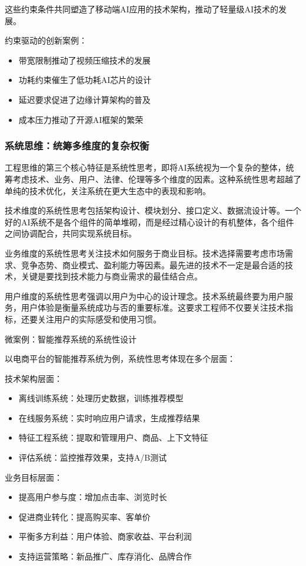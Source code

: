 这些约束条件共同塑造了移动端AI应用的技术架构，推动了轻量级AI技术的发展。

约束驱动的创新案例：

\begin{itemize}
\item 带宽限制推动了视频压缩技术的发展
\item 功耗约束催生了低功耗AI芯片的设计
\item 延迟要求促进了边缘计算架构的普及
\item 成本压力推动了开源AI框架的繁荣
\end{itemize}

\subsubsection{系统思维：统筹多维度的复杂权衡}

工程思维的第三个核心特征是系统性思考，即将AI系统视为一个复杂的整体，统筹考虑技术、业务、用户、法律、伦理等多个维度的因素。这种系统性思考超越了单纯的技术优化，关注系统在更大生态中的表现和影响。

技术维度的系统性思考包括架构设计、模块划分、接口定义、数据流设计等。一个好的AI系统不是各个组件的简单堆砌，而是经过精心设计的有机整体，各个组件之间协调配合，共同实现系统目标。

业务维度的系统性思考关注技术如何服务于商业目标。技术选择需要考虑市场需求、竞争态势、商业模式、盈利能力等因素。最先进的技术不一定是最合适的技术，关键是要找到技术能力与商业需求的最佳结合点。

用户维度的系统性思考强调以用户为中心的设计理念。技术系统最终要为用户服务，用户体验是衡量系统成功与否的重要标准。这要求工程师不仅要关注技术指标，还要关注用户的实际感受和使用习惯。

微案例：智能推荐系统的系统性设计

以电商平台的智能推荐系统为例，系统性思考体现在多个层面：

技术架构层面：
\begin{itemize}
\item 离线训练系统：处理历史数据，训练推荐模型
\item 在线服务系统：实时响应用户请求，生成推荐结果
\item 特征工程系统：提取和管理用户、商品、上下文特征
\item 评估系统：监控推荐效果，支持A/B测试
\end{itemize}

业务目标层面：
\begin{itemize}
\item 提高用户参与度：增加点击率、浏览时长
\item 促进商业转化：提高购买率、客单价
\item 平衡多方利益：用户体验、商家收益、平台利润
\item 支持运营策略：新品推广、库存消化、品牌合作
\end{itemize}

